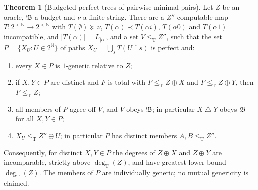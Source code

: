 \documentclass[11pt,letterpaper]{article}
\theoremstyle{definition}
\newtheorem{theorem}[definition]{Theorem}
\numberwithin{equation}{section}
\newcommand{\N}{\mathbb N}
\newcommand{\Cantor}{2^{\N}}
\newcommand{\strings}{2^{<\N}}
\newcommand{\leT}{\le_{\mathrm T}}
\newcommand{\degT}{\deg_{\mathrm T}}
\newcommand{\sd}{\mathbin{\triangle}}
\newcommand{\rest}{\mathbin{\upharpoonright}}
\newcommand{\bud}{\mathfrak B}
\newcommand{\src}[1]{\leavevmode{\sffamily\footnotesize\color{Steel}[#1]}}
\begin{document}
\begin{theorem}[Budgeted perfect trees of pairwise minimal pairs]\label{thm:budget}\src{two sets, relative to $Z$: R2, R7; perfect family, $Z=\emptyset$: R6}
Let $Z$ be an oracle, $\bud$ a budget and $\nu$ a finite string. There are a $Z''$-computable map $T:\strings\to\strings$ with $T(\emptyset)\succeq\nu$, $T(\alpha)\prec T(\alpha i)$, $T(\alpha0)$ and $T(\alpha1)$ incompatible, and $|T(\alpha)|=L_{|\alpha|}$, and a set $V\leT Z''$, such that the set $P=\{X_U:U\in\Cantor\}$ of paths $X_U=\bigcup_sT(U\rest s)$ is perfect and:
\begin{enumerate}[label=\textup{(\roman*)}]
\item every $X\in P$ is $1$-generic relative to $Z$;
\item if $X,Y\in P$ are distinct and $F$ is total with $F\leT Z\oplus X$ and $F\leT Z\oplus Y$, then $F\leT Z$;
\item all members of $P$ agree off $V$, and $V$ obeys $\bud$; in particular $X\sd Y$ obeys $\bud$ for all $X,Y\in P$;
\item $X_U\leT Z''\oplus U$; in particular $P$ has distinct members $A,B\leT Z''$.
\end{enumerate}
Consequently, for distinct $X,Y\in P$ the degrees of $Z\oplus X$ and $Z\oplus Y$ are incomparable, strictly above $\degT(Z)$, and have greatest lower bound $\degT(Z)$. The members of $P$ are individually generic; no mutual genericity is claimed.
\end{theorem}
\end{document}
